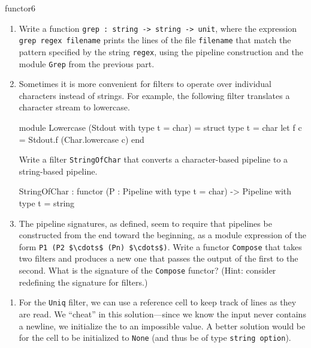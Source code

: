 \begin{exercise}{functor6}
\begin{enumerate}
\item

Write a function \hbox{\lstinline$grep : string -> string -> unit$},
where the expression \hbox{\lstinline$grep regex filename$} prints the
lines of the file \hbox{\lstinline/filename/} that match the pattern specified by
the string \hbox{\lstinline/regex/}, using the pipeline construction and the
module \hbox{\lstinline$Grep$} from the previous part.

\item

Sometimes it is more convenient for filters to operate over individual
characters instead of strings.  For example, the following filter
translates a character stream to lowercase.

\begin{ocaml}
module Lowercase (Stdout with type t = char) =
struct
   type t = char
   let f c = Stdout.f (Char.lowercase c)
end
\end{ocaml}
%
Write a filter \hbox{\lstinline$StringOfChar$} that converts a
character-based pipeline to a string-based pipeline.
%
\begin{ocaml}
StringOfChar : functor (P : Pipeline with type t = char) ->
   Pipeline with type t = string
\end{ocaml}

\item

The pipeline signatures, as defined, seem to require that pipelines be
constructed from the end toward the beginning, as a module expression
of the form \hbox{\lstinline/P1 (P2 $\cdots$ (Pn) $\cdots$)/}.  Write
a functor \hbox{\lstinline$Compose$} that takes two filters and
produces a new one that passes the output of the first to the second.
What is the signature of the \hbox{\lstinline$Compose$} functor?
(Hint: consider redefining the signature for filters.)
\end{enumerate}

\begin{answer}\ifanswers
\begin{enumerate}
\item

For the \hbox{\lstinline$Uniq$} filter, we can use a reference cell to
keep track of lines as they are read.  We ``cheat'' in this
solution---since we know the input never contains a newline, we
initialize the  to an impossible value.  A better solution
would be for the cell to be initialized to \hbox{\lstinline$None$}
(and thus be of type \hbox{\lstinline$string option$}).


\end{enumerate}
\end{answer}
\end{exercise}
